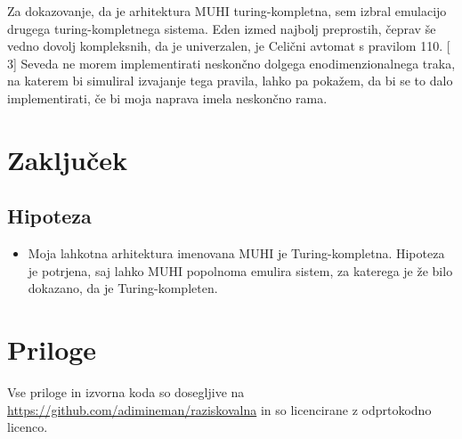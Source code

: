 \documentclass[12pt]{article}
\begin{document}
Za dokazovanje, da je arhitektura MUHI turing-kompletna, sem izbral emulacijo drugega turing-kompletnega sistema.
Eden izmed najbolj preprostih, čeprav še vedno dovolj kompleksnih, da je univerzalen, je Celični avtomat s pravilom 110. [$3$]
Seveda ne morem implementirati neskončno dolgega enodimenzionalnega traka, na katerem bi simuliral izvajanje tega pravila, lahko pa pokažem, da bi se to dalo implementirati, če bi moja naprava imela neskončno rama.

\section{Zaključek}
\subsection{Hipoteza}
\begin{itemize}
  \item Moja lahkotna arhitektura imenovana MUHI je Turing-kompletna.
  Hipoteza je potrjena, saj lahko MUHI popolnoma emulira sistem, za katerega je že bilo dokazano, da je Turing-kompleten.
\end{itemize}

\pagebreak

\section{Priloge}

Vse priloge in izvorna koda so dosegljive na \url{https://github.com/adimineman/raziskovalna} in so licencirane z odprtokodno licenco.

\lstset{
  basicstyle=\tiny,
  breaklines=true,
  frame=single,
  stepnumber=5,
}









%


\end{document}
